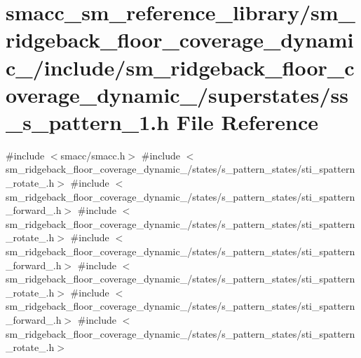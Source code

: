 \hypertarget{sm__ridgeback__floor__coverage__dynamic__1_2include_2sm__ridgeback__floor__coverage__dynamic__1_28e2e1439a9c4470806376ad3c1e1209}{}\section{smacc\+\_\+sm\+\_\+reference\+\_\+library/sm\+\_\+ridgeback\+\_\+floor\+\_\+coverage\+\_\+dynamic\+\_/include/sm\+\_\+ridgeback\+\_\+floor\+\_\+coverage\+\_\+dynamic\+\_/superstates/ss\+\_\+s\+\_\+pattern\+\_\+1.h File Reference}
\label{sm__ridgeback__floor__coverage__dynamic__1_2include_2sm__ridgeback__floor__coverage__dynamic__1_28e2e1439a9c4470806376ad3c1e1209}
{\ttfamily \#include $<$smacc/smacc.\+h$>$}\newline
{\ttfamily \#include $<$sm\+\_\+ridgeback\+\_\+floor\+\_\+coverage\+\_\+dynamic\+\_/states/s\+\_\+pattern\+\_\+states/sti\+\_\+spattern\+\_\+rotate\+\_.\+h$>$}\newline
{\ttfamily \#include $<$sm\+\_\+ridgeback\+\_\+floor\+\_\+coverage\+\_\+dynamic\+\_/states/s\+\_\+pattern\+\_\+states/sti\+\_\+spattern\+\_\+forward\+\_.\+h$>$}\newline
{\ttfamily \#include $<$sm\+\_\+ridgeback\+\_\+floor\+\_\+coverage\+\_\+dynamic\+\_/states/s\+\_\+pattern\+\_\+states/sti\+\_\+spattern\+\_\+rotate\+\_.\+h$>$}\newline
{\ttfamily \#include $<$sm\+\_\+ridgeback\+\_\+floor\+\_\+coverage\+\_\+dynamic\+\_/states/s\+\_\+pattern\+\_\+states/sti\+\_\+spattern\+\_\+forward\+\_.\+h$>$}\newline
{\ttfamily \#include $<$sm\+\_\+ridgeback\+\_\+floor\+\_\+coverage\+\_\+dynamic\+\_/states/s\+\_\+pattern\+\_\+states/sti\+\_\+spattern\+\_\+rotate\+\_.\+h$>$}\newline
{\ttfamily \#include $<$sm\+\_\+ridgeback\+\_\+floor\+\_\+coverage\+\_\+dynamic\+\_/states/s\+\_\+pattern\+\_\+states/sti\+\_\+spattern\+\_\+forward\+\_.\+h$>$}\newline
{\ttfamily \#include $<$sm\+\_\+ridgeback\+\_\+floor\+\_\+coverage\+\_\+dynamic\+\_/states/s\+\_\+pattern\+\_\+states/sti\+\_\+spattern\+\_\+rotate\+\_.\+h$>$}\newline
